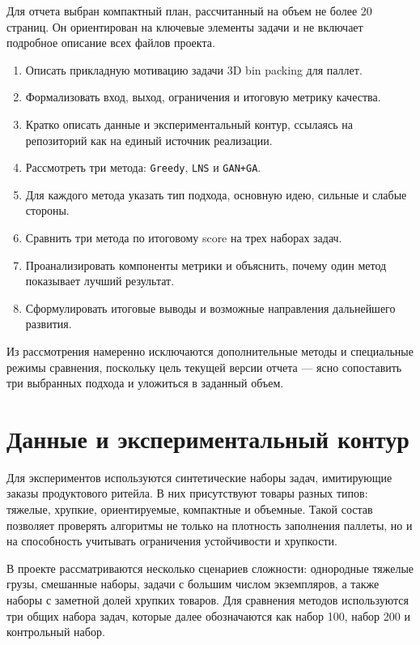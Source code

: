 \documentclass[14pt,a4paper]{extarticle}
\begin{document}
Для отчета выбран компактный план, рассчитанный на объем не более 20 страниц. Он ориентирован на ключевые элементы задачи и не включает подробное описание всех файлов проекта.

\begin{enumerate}
  \item Описать прикладную мотивацию задачи 3D bin packing для паллет.
  \item Формализовать вход, выход, ограничения и итоговую метрику качества.
  \item Кратко описать данные и экспериментальный контур, ссылаясь на репозиторий как на единый источник реализации.
  \item Рассмотреть три метода: \texttt{Greedy}, \texttt{LNS} и \texttt{GAN+GA}.
  \item Для каждого метода указать тип подхода, основную идею, сильные и слабые стороны.
  \item Сравнить три метода по итоговому score на трех наборах задач.
  \item Проанализировать компоненты метрики и объяснить, почему один метод показывает лучший результат.
  \item Сформулировать итоговые выводы и возможные направления дальнейшего развития.
\end{enumerate}

Из рассмотрения намеренно исключаются дополнительные методы и специальные режимы сравнения, поскольку цель текущей версии отчета --- ясно сопоставить три выбранных подхода и уложиться в заданный объем.

\pagebreak

\section{Данные и экспериментальный контур}

Для экспериментов используются синтетические наборы задач, имитирующие заказы продуктового ритейла. В них присутствуют товары разных типов: тяжелые, хрупкие, ориентируемые, компактные и объемные. Такой состав позволяет проверять алгоритмы не только на плотность заполнения паллеты, но и на способность учитывать ограничения устойчивости и хрупкости.

В проекте рассматриваются несколько сценариев сложности: однородные тяжелые грузы, смешанные наборы, задачи с большим числом экземпляров, а также наборы с заметной долей хрупких товаров. Для сравнения методов используются три общих набора задач, которые далее обозначаются как набор 100, набор 200 и контрольный набор.
\end{document}
